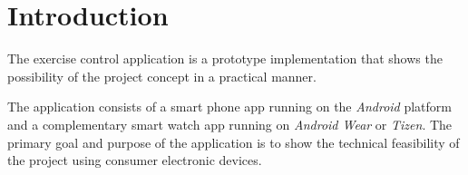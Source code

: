 \section{Introduction}

The exercise control application is a prototype implementation that shows the
possibility of the project concept in a practical manner.

The application consists of a smart phone app running on the \textit{Android}
platform and a complementary smart watch app running on \textit{Android Wear}
or \textit{Tizen}. The primary goal and purpose of the application is to show
the technical feasibility of the project using consumer electronic devices.
